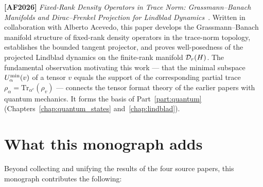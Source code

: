\medskip

\noindent\textbf{[AF2026]} \emph{Fixed-Rank Density Operators in Trace
Norm: Grassmann--Banach Manifolds and Dirac--Frenkel Projection for
Lindblad Dynamics}~\cite{AcevedoFalco2026}. Written in collaboration
with Alberto Acevedo, this paper develops the Grassmann--Banach
manifold structure of fixed-rank density operators in the trace-norm
topology, establishes the bounded tangent projector, and proves
well-posedness of the projected Lindblad dynamics on the finite-rank
manifold $\mathcal{D}_{r}(H)$. The fundamental observation motivating this
work — that the minimal subspace $U^{\min}_{\alpha}(v)$ of a tensor $v$
equals the support of the corresponding partial trace $\rho_\alpha =
\mathrm{Tr}_{\alpha^c}(\rho_v)$ — connects the tensor format theory of
the earlier papers with quantum mechanics. It forms the basis of
Part~\ref{part:quantum} (Chapters~\ref{chap:quantum_states}
and~\ref{chap:lindblad}).

\section{What this monograph adds}
\label{sec:intro:added}

Beyond collecting and unifying the results of the four source papers,
this monograph contributes the following:

